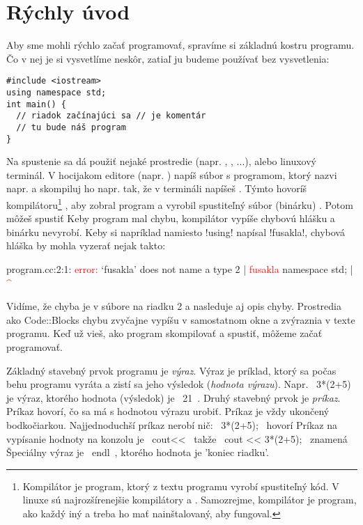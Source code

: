\chapter{Rýchly úvod}
Aby sme mohli rýchlo začať programovať,
spravíme si základnú kostru programu. Čo v nej je si vysvetlíme neskôr, zatiaľ
ju budeme používať bez vysvetlenia:

\begin{lstlisting}
#include <iostream>
using namespace std;
int main() {
  // riadok začínajúci sa // je komentár
  // tu bude náš program
}
\end{lstlisting}


Na spustenie sa dá použiť nejaké prostredie (napr.
, , ...), alebo linuxový terminál.  V
hocijakom editore (napr. ) napíš súbor s
programom, ktorý nazvi napr.  a skompiluj ho napr. tak, že
v termináli napíšeš . Týmto hovoríš
kompilátoru\footnote{%
  Kompilátor je program, ktorý z textu programu vyrobí
  spustiteľný kód. V linuxe sú najrozšírenejšie kompilátory  a
  . Samozrejme, kompilátor je program, ako každý iný a treba ho mať
  nainštalovaný, aby fungoval.  } 
, aby zobral program 
a vyrobil spustiteľný súbor (binárku) . Potom môžeš spustiť
 Keby program mal chybu, kompilátor vypíše chybovú hlášku a
binárku nevyrobí.  Keby si napríklad namiesto \prg!using! napísal
\prg!fusakla!, chybová hláška by mohla vyzerať nejak takto:

\begin{outputBox}
program.cc:2:1: \textcolor{red}{error:} ‘fusakla’ does not name a type
    2 | \textcolor{red}{fusakla} namespace std;
      | \textcolor{red}{^~~~~~}
\end{outputBox}

Vidíme, že chyba je v súbore  na riadku 2 a nasleduje aj opis chyby.
Prostredia ako Code::Blocks chybu zvyčajne vypíšu v samostatnom okne a zvýraznia v texte
programu. Keď už vieš, ako program skompilovať a spustiť, môžeme začať programovať.

Základný stavebný prvok programu je {\em výraz}. Výraz je príklad, ktorý
sa počas behu programu vyráta a zistí sa jeho výsledok ({\em hodnota výrazu}). 
Napr. \prg~3*(2+5)~ je
výraz, ktorého hodnota (výsledok) je \prg~21~.  Druhý stavebný prvok je {\em príkaz}.
Príkaz hovorí, čo sa má s hodnotou výrazu urobiť. 
Príkaz je vždy ukončený bodkočiarkou.  Najjednoduchší
príkaz nerobí nič: \prg~3*(2+5);~ hovorí  Príkaz na vypísanie hodnoty na konzolu je \prg~cout<<~ takže
\prg~cout << 3*(2+5);~ znamená  Špeciálny výraz je \prg ~endl~, ktorého hodnota je 'koniec riadku'.

